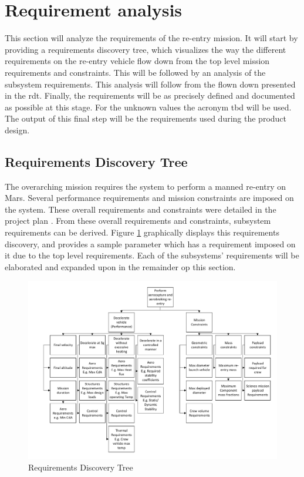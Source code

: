 \section{Requirement analysis} \label{ch:req}
This section will analyze the requirements of the re-entry mission. It will start by providing a requirements discovery tree, which visualizes the way the different requirements on the re-entry vehicle flow down from the top level mission requirements and constraints. This will be followed by an analysis of the subsystem requirements. This analysis will follow from the flown down presented in the \gls{rdt}. Finally, the requirements will be as precisely defined and documented as possible at this stage. For the unknown values the acronym \gls{tbd} will be used. The output of this final step will be the requirements used during the product design. %

\subsection{Requirements Discovery Tree}
The overarching mission requires the system to perform a manned re-entry on Mars. Several performance requirements and mission constraints are imposed on the system. These overall requirements and constraints were detailed in the project plan \cite{Balasooriyan2015}. From these overall requirements and constraints, subsystem requirements can be derived. Figure \ref{fig:RBS} graphically displays this requirements discovery, and provides a sample parameter which has a requirement imposed on it due to the top level requirements. Each of the subsystems' requirements will be elaborated and expanded upon in the remainder op this section. 


\vspace{-5mm}
\begin{figure}[H]
\centering
\includegraphics[width=1.00\textwidth]{Figure/RBS.pdf}
\vspace{-5mm}
\caption{Requirements Discovery Tree} 
\label{fig:RBS}
\end{figure}


